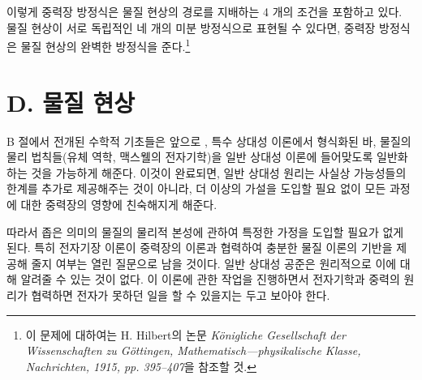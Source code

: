 \documentclass[b5paper]{article}
\begin{document}
이렇게 중력장 방정식은 물질 현상의 경로를 지배하는 4 개의 조건을 포함하고 있다. 물질 현상이 서로 독립적인 네 개의 미분 방정식으로 표현될 수 있다면, 중력장 방정식은 물질 현상의 완벽한 방정식을 준다.\footnote{이 문제에 대하여는 H. Hilbert의 논문 \emph{K\"onigliche Gesellschaft der Wissenschaften zu G\"ottingen, Mathematisch—physikalische Klasse, Nachrichten, 1915, pp. 395–407}을 참조할 것.}

\section*{D. 물질 현상}
B 절에서 전개된 수학적 기초들은 앞으로 , 특수 상대성 이론에서 형식화된 바, 물질의 물리 법칙들(유체 역학, 맥스웰의 전자기학)을 일반 상대성 이론에 들어맞도록 일반화하는 것을 가능하게 해준다. 이것이 완료되면, 일반 상대성 원리는 사실상 가능성들의 한계를 추가로 제공해주는 것이 아니라, 더 이상의 가설을 도입할 필요 없이 모든 과정에 대한 중력장의 영향에 친숙해지게 해준다.

따라서 좁은 의미의 물질의 물리적 본성에 관하여 특정한 가정을 도입할 필요가 없게 된다. 특히 전자기장 이론이 중력장의 이론과 협력하여 충분한 물질 이론의 기반을 제공해 줄지 여부는 열린 질문으로 남을 것이다. 일반 상대성 공준은 원리적으로 이에 대해 알려줄 수 있는 것이 없다. 이 이론에 관한 작업을 진행하면서 전자기학과 중력의 원리가 협력하면 전자가 못하던 일을 할 수 있을지는 두고 보아야 한다.
\end{document}
